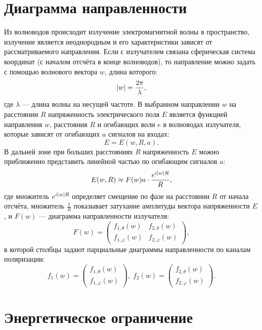 \section{Диаграмма направленности}

Из волноводов происходит излучение электромагнитной волны в пространство, излучение является неоднородным и его характеристики зависят от рассматриваемого направления.
Если с излучателем связана сферическая система координат (с началом отсчёта в конце волноводов), то направление можно задать с помощью волнового вектора $w$,
длина которого:
\[
    \left | w \right | = \frac{2 \pi}{\lambda},
\]
где $\lambda$ --- длина волны на несущей частоте. В выбранном направлении $w$ на расстоянии $R$ напряженность электрического поля $E$ является функцией
направления $w$, расстояния $R$ и огибающих волн $e$ в волноводах излучателя, которые зависят от огибающих $a$ сигналов на входах:
\[
    E = E(w, R, a).
\]
В дальней зоне при больших расстояниях $R$ напряженность $E$ можно приближенно представить линейной частью по огибающим сигналов $a$:
\begin{equation} \label{emission:emitter:diagram:tension}
    E(w,R)
    \approx F(w) a \cdot \frac{e^{i \left | w \right | R}}{R} ,
\end{equation}
где множитель $e^{i \left | w \right | R}$ определяет смещение по фазе на расстоянии $R$ от начала отсчёта, множитель $\frac{1}{R}$ показывает затухание амплитуды
вектора напряженности $E$, и $F(w)$ --- диаграмма направленности излучателя:
\[
    F(w)
    = \begin{pmatrix}
          f_{1, \theta}(w)  & f_{2, \theta}(w)  \\
          f_{1, \varphi}(w) & f_{2, \varphi}(w)
    \end{pmatrix} ,
\]
в которой столбцы задают парциальные диаграммы направленности по каналам поляризации:
\begin{equation}
    f_1(w)
    = \begin{pmatrix}
          f_{1,\theta}(w) \\
          f_{1,\varphi}(w)
    \end{pmatrix}
    , \;
    f_2(w)
    = \begin{pmatrix}
          f_{2,\theta}(w) \\
          f_{2,\varphi}(w)
    \end{pmatrix}
    \label{emission:emitter:diagram:partial}
    .
\end{equation}


\section{Энергетическое ограничение}

